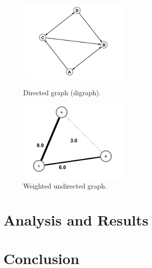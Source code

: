 \documentclass{article}
\begin{document}
\begin{multicols}{2}
\begin{figure}[ht]
\begin{minipage}[b]{0.5\linewidth}
\centering
\includegraphics[width=5.5cm,height=4cm]{Figures/graph_directed}
\caption{Directed graph (digraph).}
\label{fig:figure1}
\end{minipage}
\hspace{0.5cm}
\begin{minipage}[b]{0.4\linewidth}
\centering
\includegraphics[width=5.5cm,height=4cm]{Figures/graph_undirected_weighted}
\caption{Weighted undirected graph.}
\label{fig:figure2}
\end{minipage}
\end{figure}



\section{Analysis and Results}
\label{section.results}


\section{Conclusion}
\label{section.conclusions}





\end{multicols}
\end{document}
